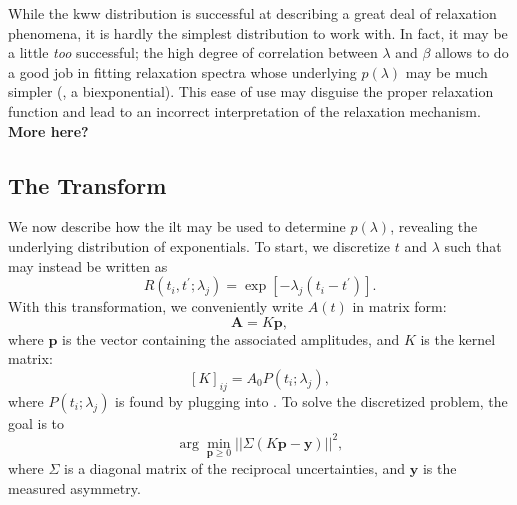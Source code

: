 While the \gls{kww} distribution is successful at describing a great deal of relaxation phenomena, it is hardly the simplest distribution to work with.
In fact, it may be a little \emph{too} successful;
the high degree of correlation between $\lambda$ and $\beta$ allows  to do a good job in fitting relaxation spectra whose underlying $p ( \lambda )$ may be much simpler (, a biexponential).
This ease of use may disguise the proper relaxation function and lead to an incorrect interpretation of the relaxation mechanism.
\textbf{More here?}


\subsection{The Transform}

We now describe how the \gls{ilt} may be used to determine $p ( \lambda )$, revealing the underlying distribution of exponentials.
To start, we discretize $t$ and $\lambda$ such that  may instead be written as
%
\begin{equation} \label{eq:slr-discrete}
   R \left (t_{i}, t^{\prime};\lambda_j \right ) = \exp \left [- \lambda_{j} \left ( t_{i} - t^{\prime} \right ) \right ] .
\end{equation}
%
With this transformation, we conveniently write $A(t)$ in matrix form:
%
\begin{equation} \label{eq:signal-matrix}
   \mathbf{A} = K \mathbf{p},
\end{equation}
%
where $\mathbf{p}$ is the vector containing the associated amplitudes, and $K$ is the kernel matrix:
%
\begin{equation}
   \label{eq:kernel}
   [K]_{ij} = A_{0} P(t_i;\lambda_j),
\end{equation}
%
where $P(t_i;\lambda_j)$ is found by plugging  into .
%
To solve the discretized problem, the goal is to
%
\begin{equation}
   \label{eq:onnls}
   \arg \min_{\mathbf{p} \geq 0} || \Sigma \left ( K \mathbf{p} - \mathbf{y} \right ) ||^{2} ,
\end{equation}
%
where $\Sigma$ is a diagonal matrix of the reciprocal uncertainties, and $\mathbf{y}$ is the measured asymmetry. 

